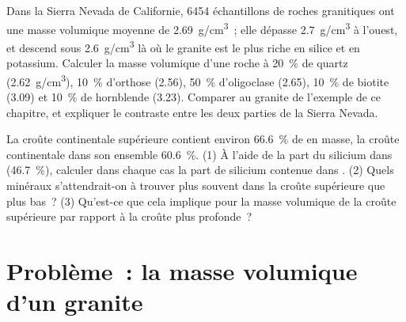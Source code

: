\begin{exercise}[$\star\star\star$]\label{exo:g11:minerals:14}
Dans la Sierra Nevada de Californie, \num{6454} échantillons de roches
granitiques ont une masse volumique moyenne de \qty{2.69}{g/cm^3}~; elle
dépasse \qty{2.7}{g/cm^3} à l'ouest, et descend sous \qty{2.6}{g/cm^3} là où
le granite est le plus riche en silice et en potassium. Calculer la masse
volumique d'une roche à \qty{20}{\percent} de quartz
(\qty{2.62}{g/cm^3}), \qty{10}{\percent} d'orthose (\qty{2.56}{}),
\qty{50}{\percent} d'oligoclase (\qty{2.65}{}), \qty{10}{\percent} de
biotite (\qty{3.09}{}) et \qty{10}{\percent} de hornblende (\qty{3.23}{}).
Comparer au granite de l'exemple de ce chapitre, et expliquer le contraste
entre les deux parties de la Sierra Nevada.
\end{exercise}

\begin{exercise}[$\star\star\star$]\label{exo:g11:minerals:15}
La croûte continentale supérieure contient environ \qty{66.6}{\percent} de
 en masse, la croûte continentale dans son ensemble
\qty{60.6}{\percent}. (1) À l'aide de la part du silicium dans 
(\qty{46.7}{\percent}), calculer dans chaque cas la part de silicium
contenue dans . (2) Quels minéraux s'attendrait-on à trouver plus
souvent dans la croûte supérieure que plus bas~? (3) Qu'est-ce que cela
implique pour la masse volumique de la croûte supérieure par rapport à la
croûte plus profonde~?
\end{exercise}

\section{Problème~: la masse volumique d'un granite}

